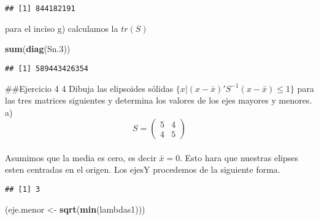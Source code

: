 \documentclass[]{article}
\newenvironment{Shaded}{\begin{snugshade}}{\end{snugshade}}
\newcommand{\DataTypeTok}[1]{\textcolor[rgb]{0.13,0.29,0.53}{#1}}
\newcommand{\DecValTok}[1]{\textcolor[rgb]{0.00,0.00,0.81}{#1}}
\newcommand{\FloatTok}[1]{\textcolor[rgb]{0.00,0.00,0.81}{#1}}
\newcommand{\KeywordTok}[1]{\textcolor[rgb]{0.13,0.29,0.53}{\textbf{#1}}}
\newcommand{\NormalTok}[1]{#1}
\newcommand{\OperatorTok}[1]{\textcolor[rgb]{0.81,0.36,0.00}{\textbf{#1}}}
\newcommand{\StringTok}[1]{\textcolor[rgb]{0.31,0.60,0.02}{#1}}
\begin{document}
\begin{verbatim}
## [1] 844182191
\end{verbatim}

para el inciso g) calculamos la \(tr(S)\)

\begin{Shaded}
\begin{Highlighting}[]
\KeywordTok{sum}\NormalTok{(}\KeywordTok{diag}\NormalTok{(Sn}\FloatTok{.3}\NormalTok{))}
\end{Highlighting}
\end{Shaded}

\begin{verbatim}
## [1] 589443426354
\end{verbatim}

\#\#Ejercicio 4 4 Dibuja las elipsoides sólidas
\(\{{x|(x − \bar{x})'S^{-1}(x − \bar{x}) ≤ 1\}}\) para las tres matrices
siguientes y determina los valores de los ejes mayores y menores.
a)\[S = \left(\begin{array}{cc} 
5 & 4\\
4 & 5
\end{array}\right)\]\\
Asumimos que la media es cero, es decir \(\bar{x} = 0\). Esto hara que
nuestras elipses esten centradas en el origen. Los ejesY procedemos de
la siguiente forma.

\begin{Shaded}
\end{Shaded}

\begin{verbatim}
## [1] 3
\end{verbatim}

\begin{Shaded}
\begin{Highlighting}[]
\NormalTok{(eje.menor <-}\StringTok{ }\KeywordTok{sqrt}\NormalTok{(}\KeywordTok{min}\NormalTok{(lambdas1)))}
\end{Highlighting}
\end{Shaded}
\end{document}
